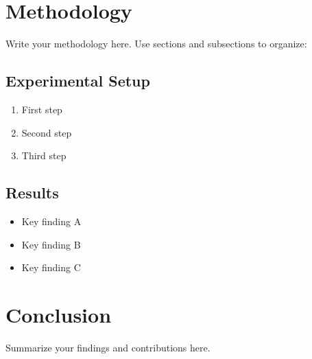 \documentclass[
  doctype=thesis,
  language=english,
  institution=none,
]{omnilatex}
\begin{document}

\chapter{Methodology}

Write your methodology here. Use sections and subsections to organize:

\section{Experimental Setup}

\begin{enumerate}
  \item First step
  \item Second step
  \item Third step
\end{enumerate}

\section{Results}

\begin{itemize}
  \item Key finding A
  \item Key finding B
  \item Key finding C
\end{itemize}


\chapter{Conclusion}

Summarize your findings and contributions here.

\end{document}
